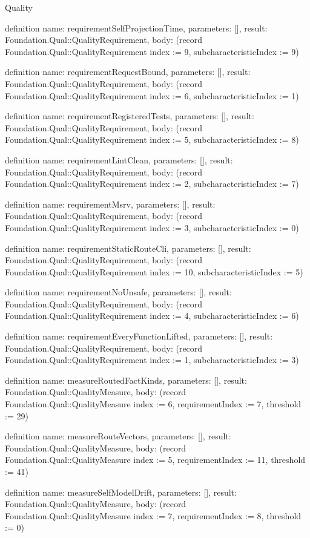 \begin{lexlean}{Quality}
\begin{semanticmodule}
definition{
  name: requirementSelfProjectionTime,
  parameters: [],
  result: Foundation.Qual::QualityRequirement,
  body: (record Foundation.Qual::QualityRequirement {index := 9, subcharacteristicIndex := 9})
}

definition{
  name: requirementRequestBound,
  parameters: [],
  result: Foundation.Qual::QualityRequirement,
  body: (record Foundation.Qual::QualityRequirement {index := 6, subcharacteristicIndex := 1})
}

definition{
  name: requirementRegisteredTests,
  parameters: [],
  result: Foundation.Qual::QualityRequirement,
  body: (record Foundation.Qual::QualityRequirement {index := 5, subcharacteristicIndex := 8})
}

definition{
  name: requirementLintClean,
  parameters: [],
  result: Foundation.Qual::QualityRequirement,
  body: (record Foundation.Qual::QualityRequirement {index := 2, subcharacteristicIndex := 7})
}

definition{
  name: requirementMsrv,
  parameters: [],
  result: Foundation.Qual::QualityRequirement,
  body: (record Foundation.Qual::QualityRequirement {index := 3, subcharacteristicIndex := 0})
}

definition{
  name: requirementStaticRouteCli,
  parameters: [],
  result: Foundation.Qual::QualityRequirement,
  body: (record Foundation.Qual::QualityRequirement {index := 10, subcharacteristicIndex := 5})
}

definition{
  name: requirementNoUnsafe,
  parameters: [],
  result: Foundation.Qual::QualityRequirement,
  body: (record Foundation.Qual::QualityRequirement {index := 4, subcharacteristicIndex := 6})
}

definition{
  name: requirementEveryFunctionLifted,
  parameters: [],
  result: Foundation.Qual::QualityRequirement,
  body: (record Foundation.Qual::QualityRequirement {index := 1, subcharacteristicIndex := 3})
}

definition{
  name: measureRoutedFactKinds,
  parameters: [],
  result: Foundation.Qual::QualityMeasure,
  body: (record Foundation.Qual::QualityMeasure {index := 6, requirementIndex := 7, threshold := 29})
}

definition{
  name: measureRouteVectors,
  parameters: [],
  result: Foundation.Qual::QualityMeasure,
  body: (record Foundation.Qual::QualityMeasure {index := 5, requirementIndex := 11, threshold := 41})
}

definition{
  name: measureSelfModelDrift,
  parameters: [],
  result: Foundation.Qual::QualityMeasure,
  body: (record Foundation.Qual::QualityMeasure {index := 7, requirementIndex := 8, threshold := 0})
}


\end{semanticmodule}
\end{lexlean}
